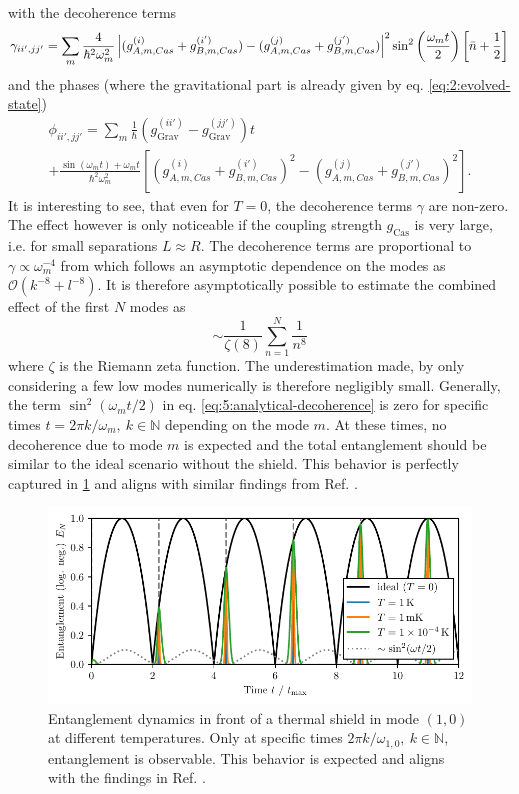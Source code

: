 with the decoherence terms
\begin{equation}\label{eq:5:analytical-decoherence}
  \gamma_{ii',jj'} = \sum_m \frac{4}{\hbar^2\omega_m^2} \left\lvert(g^{(i)}_{A,m,Cas} + g^{(i')}_{B,m,Cas}) - (g^{(j)}_{A,m,Cas} + g^{(j')}_{B,m,Cas})\right\rvert^2 \sin^2\left(\frac{\omega_m t}{2}\right) \left[\bar{n} + \frac{1}{2}\right]
\end{equation}
and the phases (where the gravitational part is already given by eq. \eqref{eq:2:evolved-state})
\begin{multline}\label{eq:5:analytical-phases}
  \phi_{ii',jj'} = \sum_m \frac{1}{\hbar} \left( g^{(ii')}_\mathrm{Grav} - g^{(jj')}_\mathrm{Grav} \right) t \\
  + \frac{\sin(\omega_m t)+\omega_m t}{\hbar^2\omega_m^2}\left[(g^{(i)}_{A,m,Cas} + g^{(i')}_{B,m,Cas})^2 - (g^{(j)}_{A,m,Cas} + g^{(j')}_{B,m,Cas})^2\right] .
\end{multline}
It is interesting to see, that even for $T=0$, the decoherence terms $\gamma$ are non-zero. The effect however is only noticeable if the coupling strength $g_\mathrm{Cas}$ is very large, i.e. for small separations $L \approx R$.
The decoherence terms are proportional to $\gamma \propto \omega_m^{-4}$ from which follows an asymptotic dependence on the modes as $\mathcal{O}(k^{-8}+l^{-8})$.
It is therefore asymptotically possible to estimate the combined effect of the first $N$ modes as
\begin{equation}
  \sim \frac{1}{\zeta(8)} \sum_{n=1}^{N} \frac{1}{n^8}
\end{equation}
where $\zeta$ is the Riemann zeta function. The underestimation made, by only considering a few low modes numerically is therefore negligibly small.
Generally, the term $\sin^2(\omega_m t / 2)$ in eq. \eqref{eq:5:analytical-decoherence} is zero for specific times $t = 2 \pi k / \omega_m,\ k\in\mathbb{N}$ depending on the mode $m$. At these times, no decoherence due to mode $m$ is expected and the total entanglement should be similar to the ideal scenario without the shield. This behavior is perfectly captured in \cref{fig:5:entanglement-time-single-mode} and aligns with similar findings from Ref. \cite{Pedernales_2022}.
\begin{figure}[!htbp]
  \centering
  \includegraphics[width=\textwidth]{./../figures/vibrations/entanglement-hamiltonian.pdf}
  \caption{Entanglement dynamics in front of a thermal shield in mode $(1,0)$ at different temperatures. Only at specific times $2\pi k / \omega_{1,0},\ k\in\mathbb{N}$, entanglement is observable. This behavior is expected and aligns with the findings in Ref. \cite{Pedernales_2022}.}
  \label{fig:5:entanglement-time-single-mode}
\end{figure}
